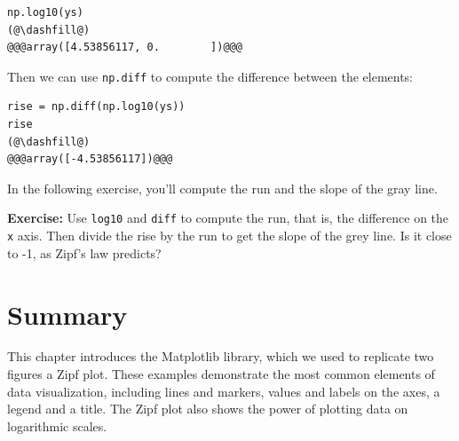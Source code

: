 \begin{lstlisting}[]
np.log10(ys)
(@\dashfill@)
@@@array([4.53856117, 0.        ])@@@
\end{lstlisting}

Then we can use \passthrough{\lstinline!np.diff!} to compute the
difference between the elements:

\begin{lstlisting}[]
rise = np.diff(np.log10(ys))
rise
(@\dashfill@)
@@@array([-4.53856117])@@@
\end{lstlisting}

In the following exercise, you'll compute the run and the slope of the
gray line.

\textbf{Exercise:} Use \passthrough{\lstinline!log10!} and
\passthrough{\lstinline!diff!} to compute the run, that is, the
difference on the \passthrough{\lstinline!x!} axis. Then divide the rise
by the run to get the slope of the grey line. Is it close to -1, as
Zipf's law predicts?

\hypertarget{summary}{%
\section{Summary}\label{summary}}

This chapter introduces the Matplotlib library, which we used to
replicate two figures a Zipf plot. These examples demonstrate the most
common elements of data visualization, including lines and markers,
values and labels on the axes, a legend and a title. The Zipf plot also
shows the power of plotting data on logarithmic scales.

